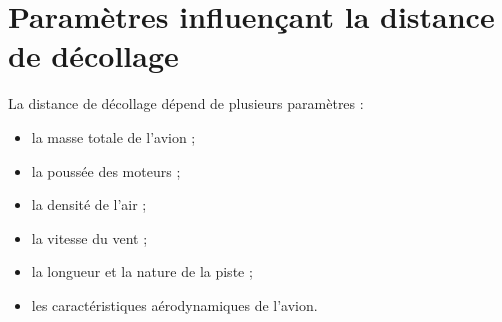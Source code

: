 	\vspace{1cm}
	
	
	
	
	
	
	\section{Paramètres influençant la distance de décollage}
	
		La distance de décollage dépend de plusieurs paramètres :
		
		\begin{itemize}
			\item la masse totale de l’avion ;
			\item la poussée des moteurs ;
			\item la densité de l’air ;
			\item la vitesse du vent ;
			\item la longueur et la nature de la piste ;
			\item les caractéristiques aérodynamiques de l’avion.
		\end{itemize}
		
		
		
		
		
		
	
	
	
	
	
	
	
	
	
	
	
	
	
	
	
	
	
	






